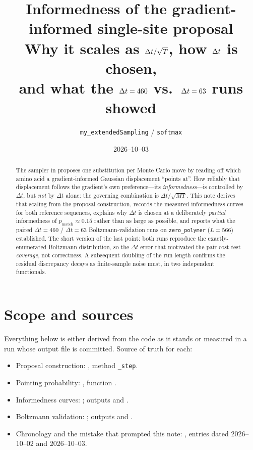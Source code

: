 \documentclass[11pt,a4paper]{article}
\title{Informedness of the gradient-informed single-site proposal\\
       \large Why it scales as $\dt/\sqrt{T}$, how $\dt$ is chosen,\\
       and what the $\dt=460$ vs.\ $\dt=63$ runs showed}
\author{\texttt{my\_extendedSampling} / \texttt{softmax}}
\date{2026--10--03}
\newcommand{\dt}{\Delta t}
\newcommand{\pmatch}{p_{\mathrm{match}}}
\newcommand{\Mass}{M}
\begin{document}
\maketitle

\begin{abstract}
\noindent
The sampler in  proposes one substitution per
Monte Carlo move by reading off which amino acid a gradient-informed Gaussian
displacement ``points at''. How reliably that displacement follows the
gradient's own preference---its \emph{informedness}---is controlled by $\dt$,
but \emph{not} by $\dt$ alone: the governing combination is
$\dt/\sqrt{\Mass T}$. This note derives that scaling from the proposal
construction, records the measured informedness curves for both reference
sequences, explains why $\dt$ is chosen at a deliberately \emph{partial}
informedness of $\pmatch\!\approx\!0.15$ rather than as large as possible, and
reports what the paired $\dt=460$ / $\dt=63$ Boltzmann-validation runs on
\texttt{zero\_polymer} ($L=566$) established. The short version of the last
point: both runs reproduce the exactly-enumerated Boltzmann distribution, so
the $\dt$ error that motivated the pair cost test \emph{coverage}, not
correctness. A subsequent doubling of the run length confirms the residual
discrepancy decays as finite-sample noise must, in two independent
functionals.
\end{abstract}

\tableofcontents

\section{Scope and sources}

Everything below is either derived from the code as it stands or measured in a
run whose output file is committed. Source of truth for each:

\begin{itemize}
  \item Proposal construction: , method
        \texttt{\_step}.
  \item Pointing probability: , function
        .
  \item Informedness curves: ;
        outputs  and
        .
  \item Boltzmann validation: ;
        outputs 
        and .
  \item Chronology and the mistake that prompted this note:
        , entries dated 2026--10--02 and
        2026--10--03.
\end{itemize}
\end{document}
